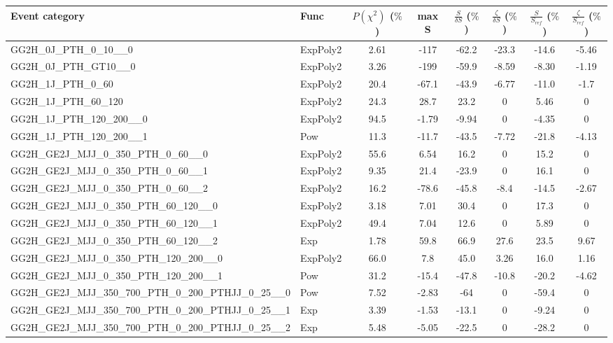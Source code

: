 \begin{table}[!h]
   \centering  \scriptsize
    \begin{tabular}{llcccccc}
    \hline
    \hline
    Event category               & Func  &  $P(\chi^2)$ ($\%$) & max S  & $\frac{S}{\delta S}$ ($\%$)  &  $\frac{\zeta}{\delta S}$ ($\%$)   & $\frac{S}{S_{ref}}$ ($\%$) & $\frac{\zeta}{S_{ref}}$ ($\%$)  \\ \hline
    \hline
GG2H\_0J\_PTH\_0\_10\_\_0 & ExpPoly2 & 2.61 & -117 & -62.2 & -23.3 & -14.6 & -5.46 \\
GG2H\_0J\_PTH\_GT10\_\_0 & ExpPoly2 & 3.26 & -199 & -59.9 & -8.59 & -8.30 & -1.19 \\
GG2H\_1J\_PTH\_0\_60 & ExpPoly2 & 20.4 & -67.1 & -43.9 & -6.77 & -11.0 & -1.7 \\
GG2H\_1J\_PTH\_60\_120 & ExpPoly2 & 24.3 & 28.7 & 23.2 & 0 & 5.46 & 0 \\
GG2H\_1J\_PTH\_120\_200\_\_0 & ExpPoly2 & 94.5 & -1.79 & -9.94 & 0 & -4.35 & 0 \\
GG2H\_1J\_PTH\_120\_200\_\_1 & Pow & 11.3 & -11.7 & -43.5 & -7.72 & -21.8 & -4.13 \\
GG2H\_GE2J\_MJJ\_0\_350\_PTH\_0\_60\_\_0 & ExpPoly2 & 55.6 & 6.54 & 16.2 & 0 & 15.2 & 0 \\
GG2H\_GE2J\_MJJ\_0\_350\_PTH\_0\_60\_\_1 & ExpPoly2 & 9.35 & 21.4 & -23.9 & 0 & 16.1 & 0 \\
 GG2H\_GE2J\_MJJ\_0\_350\_PTH\_0\_60\_\_2 & ExpPoly2 & 16.2 & -78.6 & -45.8 & -8.4 & -14.5 & -2.67 \\
 GG2H\_GE2J\_MJJ\_0\_350\_PTH\_60\_120\_\_0 & ExpPoly2 & 3.18 & 7.01 & 30.4 & 0 & 17.3 & 0\\
 GG2H\_GE2J\_MJJ\_0\_350\_PTH\_60\_120\_\_1 & ExpPoly2 & 49.4 & 7.04 & 12.6 & 0 & 5.89 & 0\\
 GG2H\_GE2J\_MJJ\_0\_350\_PTH\_60\_120\_\_2 & Exp & 1.78 & 59.8 & 66.9 & 27.6 & 23.5 & 9.67 \\
 GG2H\_GE2J\_MJJ\_0\_350\_PTH\_120\_200\_\_0 & ExpPoly2 & 66.0 & 7.8 & 45.0 & 3.26 & 16.0 & 1.16 \\
 GG2H\_GE2J\_MJJ\_0\_350\_PTH\_120\_200\_\_1 & Pow & 31.2 & -15.4 & -47.8 & -10.8 & -20.2 & -4.62 \\
 GG2H\_GE2J\_MJJ\_350\_700\_PTH\_0\_200\_PTHJJ\_0\_25\_\_0 & Pow & 7.52 & -2.83 & -64 & 0 & -59.4 & 0 \\
 GG2H\_GE2J\_MJJ\_350\_700\_PTH\_0\_200\_PTHJJ\_0\_25\_\_1 & Exp & 3.39 & -1.53 & -13.1 & 0 & -9.24 & 0\\
 GG2H\_GE2J\_MJJ\_350\_700\_PTH\_0\_200\_PTHJJ\_0\_25\_\_2 & Exp & 5.48 & -5.05 & -22.5 & 0 & -28.2 & 0\\

\end{tabular}
\end{table}
